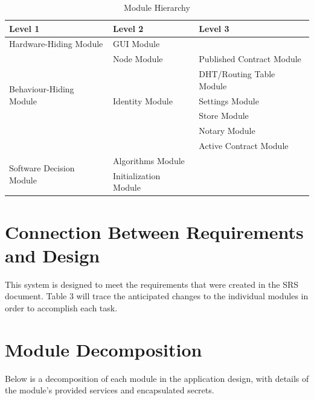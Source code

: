 \documentclass{article}
\begin{document}
\begin{table}[h!]
	\centering
	\begin{tabular}{p{} p{} p{}}
		\toprule
		\textbf{Level 1} & \textbf{Level 2} & \textbf{Level 3}\\
		\midrule
		
		{Hardware-Hiding Module} & GUI Module & ~ \\
		\midrule
		
		\multirow{5}{0.4\textwidth}{Behaviour-Hiding Module} & Node Module & Published Contract Module \\
		& ~ & DHT/Routing Table Module\\
		& Identity Module & Settings Module\\
		& ~ & Store Module\\
		& ~ & Notary Module\\
		& ~ & Active Contract Module\\
		\midrule
		
		\multirow{3}{0.4\textwidth}{Software Decision Module} & Algorithms Module & ~ \\
		& Initialization Module & ~ \\
		\bottomrule
		
	\end{tabular}
	\caption{Module Hierarchy}
	\label{TblMH}
\end{table}



\section*{Connection Between Requirements and Design}
This system is designed to meet the requirements that were created in the SRS document. Table 3 will trace the anticipated changes to the individual modules in order to accomplish each task.


\section*{Module Decomposition}
Below is a decomposition of each module in the application design, with details of the module's provided services and encapsulated secrets.
\end{document}
